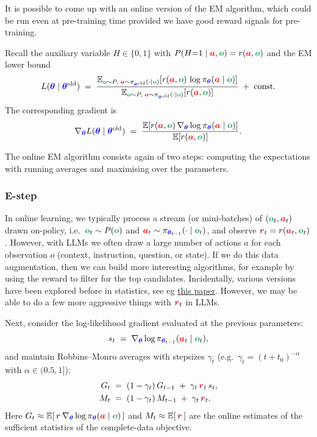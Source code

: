 \documentclass{article}
\newcommand{\colsym}[2]{\ensuremath{\textcolor{#1}{\boldsymbol{#2}}}}
\newcommand{\action}{\colsym{red}{a}}
\newcommand{\obs}{\colsym{ForestGreen}{o}}
\newcommand{\reward}{\colsym{purple}{r}}
\newcommand{\params}{\colsym{blue}{\theta}}
\begin{document}
It is possible to come up with an online version of the EM algorithm, which could be run even at pre-training time provided we have good reward signals for pre-training.

Recall the auxiliary variable $H\in\{0,1\}$ with $P(H{=}1 \mid \action,\obs)=r(\action,\obs)$ and the EM lower bound
\[
L(\params \mid \params^{\text{old}})\;=\; \frac{\mathbb{E}_{\obs\sim P,\;\action\sim \pi_{\params^{\text{old}}}(\cdot\mid\obs)}
\!\left[r(\action,\obs)\,\log \pi_{\params}(\action\mid\obs)\right]}{\mathbb{E}_{\obs\sim P,\;\action\sim \pi_{\params^{\text{old}}}(\cdot\mid\obs)}\!\left[r(\action,\obs)\right]}
\;+\;\text{const.}
\]
The corresponding gradient is
\[
\nabla_{\params} L(\params \mid \params^{\text{old}})\;=\;
\frac{\mathbb{E}\!\left[r(\action,\obs)\,\nabla_{\params}\log \pi_{\params}(\action\mid\obs)\right]}
{\mathbb{E}\!\left[r(\action,\obs)\right]}.
\]

The online EM algorithm consists again of two steps: computing the expectations with running averages and maximising over the parameters.

\subsubsection{E-step}
In online learning, we typically process a stream (or mini-batches) of $(\obs_t,\action_t)$ drawn on-policy, i.e.\ $\obs_t\sim P(\obs)$ and $\action_t\sim \pi_{\params_{t-1}}(\cdot\mid \obs_t)$, and observe $\reward_t =  r(\action_t,\obs_t)$. However, with LLMs we often draw a large number of actions $a$ for each observation $o$ (context, instruction, question, or state). If we do this data augmentation, then we can build more interesting algorithms, for example by using the reward to filter for the top candidates. Incidentally, various versions have been explored before in statistics, see eg \href{https://inria.hal.science/inria-00074164/document}{this paper}. However, we may be able to do a few more aggressive things with $\reward_t$ in LLMs.


Next, consider the log-likelihood gradient evaluated at the previous parameters:
\[
s_t \;= \; \nabla_{\params}\log \pi_{\params_{t-1}}(\action_t\mid\obs_t),
\]
and maintain Robbins--Monro averages with stepsizes $\gamma_t$ (e.g.\ $\gamma_t=(t+t_0)^{-\alpha}$ with $\alpha\in(0.5,1]$):
\begin{align}
G_t &\;=\; (1-\gamma_t)\,G_{t-1} \;+\; \gamma_t\, \reward_t\, s_t, \label{eq:onlineG}\\
M_t &\;=\; (1-\gamma_t)\,M_{t-1} \;+\; \gamma_t\, \reward_t. \label{eq:onlineM}
\end{align}
Here $G_t \approx \mathbb{E}[\,\reward\,\nabla_{\params}\log \pi_{\params}(\action\mid\obs)\,]$ and $M_t \approx \mathbb{E}[\,\reward\,]$ are the online estimates of the sufficient statistics of the complete-data objective.
\end{document}
